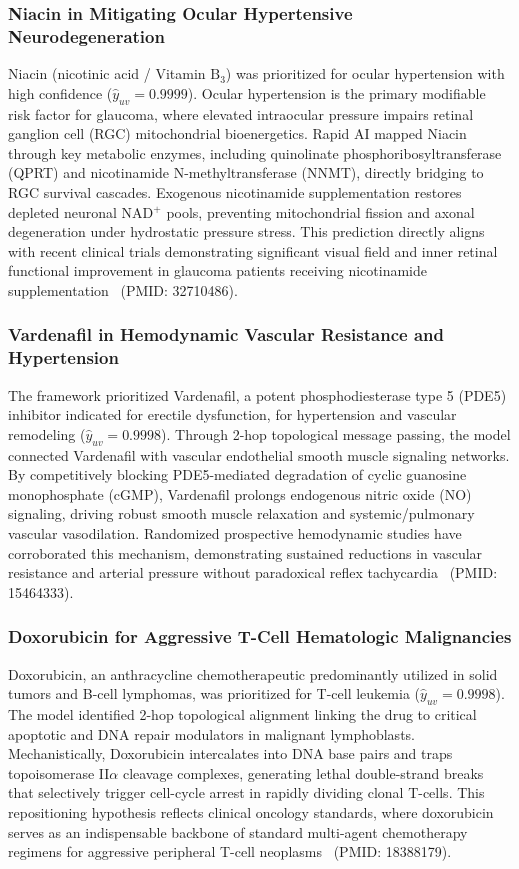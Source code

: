 \documentclass[conference,a4paper]{IEEEtran}
\begin{document}
\subsubsection{Niacin in Mitigating Ocular Hypertensive Neurodegeneration}
Niacin (nicotinic acid / Vitamin $\text{B}_3$) was prioritized for ocular hypertension with high confidence ($\hat{y}_{uv} = 0.9999$). Ocular hypertension is the primary modifiable risk factor for glaucoma, where elevated intraocular pressure impairs retinal ganglion cell (RGC) mitochondrial bioenergetics. Rapid AI mapped Niacin through key metabolic enzymes, including quinolinate phosphoribosyltransferase (QPRT) and nicotinamide N-methyltransferase (NNMT), directly bridging to RGC survival cascades. Exogenous nicotinamide supplementation restores depleted neuronal NAD$^+$ pools, preventing mitochondrial fission and axonal degeneration under hydrostatic pressure stress. This prediction directly aligns with recent clinical trials demonstrating significant visual field and inner retinal functional improvement in glaucoma patients receiving nicotinamide supplementation~\cite{ref_niacin} (PMID: 32710486).

\subsubsection{Vardenafil in Hemodynamic Vascular Resistance and Hypertension}
The framework prioritized Vardenafil, a potent phosphodiesterase type 5 (PDE5) inhibitor indicated for erectile dysfunction, for hypertension and vascular remodeling ($\hat{y}_{uv} = 0.9998$). Through 2-hop topological message passing, the model connected Vardenafil with vascular endothelial smooth muscle signaling networks. By competitively blocking PDE5-mediated degradation of cyclic guanosine monophosphate (cGMP), Vardenafil prolongs endogenous nitric oxide (NO) signaling, driving robust smooth muscle relaxation and systemic/pulmonary vascular vasodilation. Randomized prospective hemodynamic studies have corroborated this mechanism, demonstrating sustained reductions in vascular resistance and arterial pressure without paradoxical reflex tachycardia~\cite{ref_vardenafil} (PMID: 15464333).

\subsubsection{Doxorubicin for Aggressive T-Cell Hematologic Malignancies}
Doxorubicin, an anthracycline chemotherapeutic predominantly utilized in solid tumors and B-cell lymphomas, was prioritized for T-cell leukemia ($\hat{y}_{uv} = 0.9998$). The model identified 2-hop topological alignment linking the drug to critical apoptotic and DNA repair modulators in malignant lymphoblasts. Mechanistically, Doxorubicin intercalates into DNA base pairs and traps topoisomerase II$\alpha$ cleavage complexes, generating lethal double-strand breaks that selectively trigger cell-cycle arrest in rapidly dividing clonal T-cells. This repositioning hypothesis reflects clinical oncology standards, where doxorubicin serves as an indispensable backbone of standard multi-agent chemotherapy regimens for aggressive peripheral T-cell neoplasms~\cite{ref_doxorubicin} (PMID: 18388179).
\end{document}
